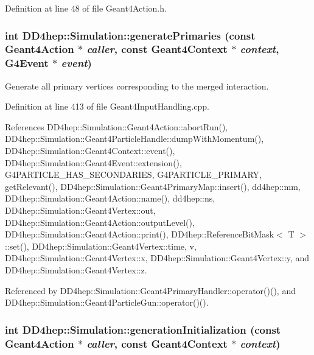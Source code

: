 Definition at line 48 of file Geant4Action.h.\hypertarget{namespace_d_d4hep_1_1_simulation_af9101fceaeec2ab63e17c360a22638cd}{
\subsubsection[{generatePrimaries}]{\setlength{\rightskip}{0pt plus 5cm}int DD4hep::Simulation::generatePrimaries (const {\bf Geant4Action} $\ast$ {\em caller}, \/  const {\bf Geant4Context} $\ast$ {\em context}, \/  G4Event $\ast$ {\em event})}}
\label{namespace_d_d4hep_1_1_simulation_af9101fceaeec2ab63e17c360a22638cd}


Generate all primary vertices corresponding to the merged interaction. 

Definition at line 413 of file Geant4InputHandling.cpp.

References DD4hep::Simulation::Geant4Action::abortRun(), DD4hep::Simulation::Geant4ParticleHandle::dumpWithMomentum(), DD4hep::Simulation::Geant4Context::event(), DD4hep::Simulation::Geant4Event::extension(), G4PARTICLE\_\-HAS\_\-SECONDARIES, G4PARTICLE\_\-PRIMARY, getRelevant(), DD4hep::Simulation::Geant4PrimaryMap::insert(), dd4hep::mm, DD4hep::Simulation::Geant4Action::name(), dd4hep::ns, DD4hep::Simulation::Geant4Vertex::out, DD4hep::Simulation::Geant4Action::outputLevel(), DD4hep::Simulation::Geant4Action::print(), DD4hep::ReferenceBitMask$<$ T $>$::set(), DD4hep::Simulation::Geant4Vertex::time, v, DD4hep::Simulation::Geant4Vertex::x, DD4hep::Simulation::Geant4Vertex::y, and DD4hep::Simulation::Geant4Vertex::z.

Referenced by DD4hep::Simulation::Geant4PrimaryHandler::operator()(), and DD4hep::Simulation::Geant4ParticleGun::operator()().\hypertarget{namespace_d_d4hep_1_1_simulation_aaf70bd3ee9651c20efdf16a10dfa8dc8}{
\subsubsection[{generationInitialization}]{\setlength{\rightskip}{0pt plus 5cm}int DD4hep::Simulation::generationInitialization (const {\bf Geant4Action} $\ast$ {\em caller}, \/  const {\bf Geant4Context} $\ast$ {\em context})}}
\label{namespace_d_d4hep_1_1_simulation_aaf70bd3ee9651c20efdf16a10dfa8dc8}


